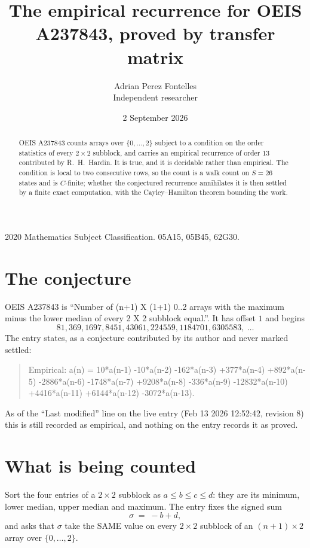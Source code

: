 \documentclass[11pt,a4paper]{article}
\title{The empirical recurrence for OEIS A237843, proved by transfer matrix}
\author{Adrian Perez Fontelles\\ \small Independent researcher}
\date{2 September 2026}
\theoremstyle{plain}
\theoremstyle{definition}
\begin{document}
\maketitle

\begin{abstract}
OEIS A237843 counts arrays over $\{0,\dots,2\}$ subject to a condition on the order
statistics of every $2\times2$ subblock, and carries an empirical recurrence of order
$13$ contributed by R.~H.~Hardin. It is true, and it is decidable rather than empirical.
The condition is local to two consecutive rows, so the count is a walk count on $S=26$
states and is $C$-finite; whether the conjectured recurrence annihilates it is then settled by
a finite exact computation, with the Cayley--Hamilton theorem bounding the work.
\end{abstract}

\noindent\small 2020 Mathematics Subject Classification. 05A15, 05B45, 62G30.\normalsize

\section{The conjecture}

OEIS A237843 is ``Number of (n+1) X (1+1) 0..2 arrays with the maximum minus the lower median of every 2 X 2 subblock equal.''. It has offset $1$ and begins
\[
81, 369, 1697, 8451, 43061, 224559, 1184701, 6305583,\ \dots
\]
The entry states, as a conjecture contributed by its author and never marked settled:
\begin{quote}
Empirical: a(n) = 10*a(n-1) -10*a(n-2) -162*a(n-3) +377*a(n-4) +892*a(n-5) -2886*a(n-6) -1748*a(n-7) +9208*a(n-8) -336*a(n-9) -12832*a(n-10) +4416*a(n-11) +6144*a(n-12) -3072*a(n-13).
\end{quote}
As of the ``Last modified'' line on the live entry (Feb 13 2026 12:52:42, revision 8) this is still
recorded as empirical, and nothing on the entry records it as proved.

\section{What is being counted}

Sort the four entries of a $2\times2$ subblock as $a\le b\le c\le d$: they
are its minimum, lower median, upper median and maximum. The entry fixes the signed sum
\[
\sigma\;=\;-b+d,
\]
and asks that $\sigma$ take the SAME value on every $2\times2$ subblock of an
$(n+1)\times2$ array over $\{0,\dots,2\}$.
\end{document}
